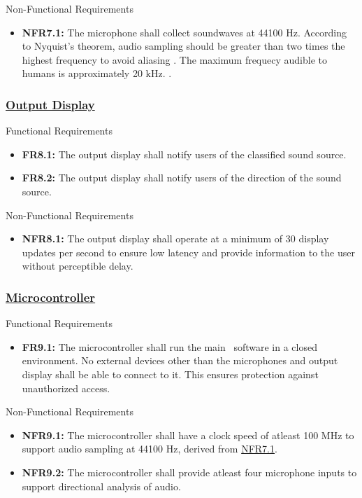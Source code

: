 \documentclass[12pt]{article}
\theoremstyle{definition}
\begin{document}
Non-Functional Requirements
\begin{itemize}
  \item \label{NFR7_1}\textbf{NFR7.1:} The microphone shall collect soundwaves
  at 44100 Hz. According to Nyquist's theorem, audio sampling should be greater
  than two times the highest frequency to avoid aliasing \cite{DataForth2025}.
  The maximum frequecy audible to humans is approximately 20 kHz.
  \cite{Neuroscience2001}.
\end{itemize}

\subsubsection{\hyperref[comp:display]{Output Display}}
Functional Requirements
\begin{itemize}
  \item \label{FR8_1}\textbf{FR8.1:} The output display shall notify users of 
  the classified sound source.

  \item \label{FR8_2}\textbf{FR8.2:} The output display shall notify users of 
  the direction of the sound source.
\end{itemize}

Non-Functional Requirements
\begin{itemize}
  \item \label{NFR8_1}\textbf{NFR8.1:} The output display shall operate at a
  minimum of 30 display updates per second to ensure low latency and provide
  information to the user without perceptible delay.
\end{itemize}

\subsubsection{\hyperref[comp:microcontroller]{Microcontroller}}
Functional Requirements
\begin{itemize}
  \item \label{FR9_1}\textbf{FR9.1:} The microcontroller shall run the main
  \progname ~software in a closed environment. No external devices
  other than the microphones and output display shall be able to connect to it.
  This ensures protection against unauthorized access.
\end{itemize}

Non-Functional Requirements
\begin{itemize}
  \item \label{NFR9_1}\textbf{NFR9.1:} The microcontroller shall have a clock 
  speed of atleast 100 MHz to support audio sampling at 44100 Hz, derived
  from \hyperref[NFR7_1]{NFR7.1}.

  \item \label{FR9_2}\textbf{NFR9.2:} The microcontroller shall provide atleast
  four microphone inputs to support directional analysis of audio.
\end{itemize}
\end{document}

